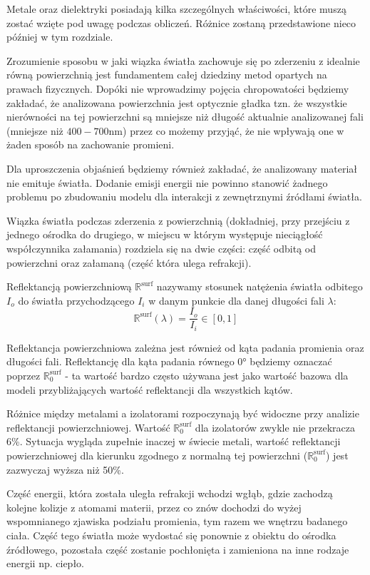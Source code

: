 \documentclass[../main.tex]{subfiles}
\begin{document}
Metale oraz dielektryki posiadają kilka szczególnych właściwości, które muszą zostać wzięte pod uwagę podczas obliczeń. Różnice zostaną przedstawione nieco później w tym rozdziale.

Zrozumienie sposobu w jaki wiązka światła zachowuje się po zderzeniu z idealnie równą powierzchnią jest fundamentem całej dziedziny metod opartych na prawach fizycznych. Dopóki nie wprowadzimy pojęcia chropowatości będziemy zakładać, że analizowana powierzchnia jest optycznie gładka tzn. że wszystkie nierówności na tej powierzchni są mniejsze niż długość aktualnie analizowanej fali (mniejsze niż $400-700$nm) przez co możemy przyjąć, że nie wpływają one w żaden sposób na zachowanie promieni.

Dla uproszczenia objaśnień będziemy również zakładać, że analizowany materiał nie emituje światła. Dodanie emisji energii nie powinno stanowić żadnego problemu po zbudowaniu modelu dla interakcji z zewnętrznymi źródłami światła.

Wiązka światła podczas zderzenia z powierzchnią (dokładniej, przy przejściu z jednego ośrodka do drugiego, w miejscu w którym występuje nieciągłość współczynnika załamania) rozdziela się na dwie części: część odbitą od powierzchni oraz załamaną (część która ulega refrakcji).

Reflektancją powierzchniową $\mathbb{R}^{\text{surf}}$ \cite{pbr_games_siggraph} nazywamy stosunek natężenia światła odbitego $I_o$ do światła przychodzącego $I_i$ w danym punkcie dla danej długości fali $\lambda$:
\[
	\mathbb{R}^{\text{surf}}(\lambda) = \frac{
        I_o
    }{
        I_i
    } \in \left[
        0, 1 
    \right]
\]

Reflektancja powierzchniowa zależna jest również od kąta padania promienia oraz długości fali. Reflektancję dla kąta padania równego $\ang{0}$ będziemy oznaczać poprzez $\mathbb{R}^{\text{surf}}_{0}$ - ta wartość bardzo często używana jest jako wartość bazowa dla modeli przybliżających wartość reflektancji dla wszystkich kątów. 

Różnice między metalami a izolatorami rozpoczynają być widoczne przy analizie reflektancji powierzchniowej. Wartość $\mathbb{R}^{\text{surf}}_{0}$ dla izolatorów zwykle nie przekracza 6\%. Sytuacja wygląda zupełnie inaczej w świecie metali, wartość reflektancji powierzchniowej dla kierunku zgodnego z normalną tej powierzchni ($\mathbb{R}^{\text{surf}}_{0}$) jest zazwyczaj wyższa niż 50\%.

Część energii, która została uległa refrakcji wchodzi wgłąb, gdzie zachodzą kolejne kolizje z atomami materii, przez co znów dochodzi do wyżej wspomnianego zjawiska podziału promienia, tym razem we wnętrzu badanego ciała. Część tego światła może wydostać się ponownie z obiektu do ośrodka źródłowego, pozostała część zostanie pochłonięta i zamieniona na inne rodzaje energii np. ciepło.
\end{document}
